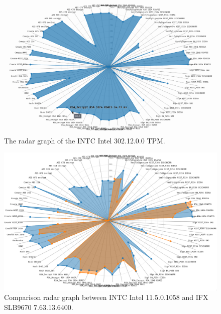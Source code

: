 \begin{landscape}
\begin{figure}[!t]
    \centering
    \includegraphics[width=\linewidth]{img/visualizations/INTC_Intel_302.12.0.0 radar graph.png}
    \caption{
    The radar graph of the INTC Intel 302.12.0.0 TPM.
    }
\end{figure}
\end{landscape}

\begin{landscape}
\begin{figure}[!t]
    \centering
    \includegraphics[width=\linewidth]{img/visualizations/INTC_Intel_11.5.0.1058_vs_IFX_SLB9670_7.63.13.6400-radar-comparison.png}
    \caption{
    Comparison radar graph between INTC Intel 11.5.0.1058 and IFX SLB9670 7.63.13.6400.
    }
\end{figure}
\end{landscape}

